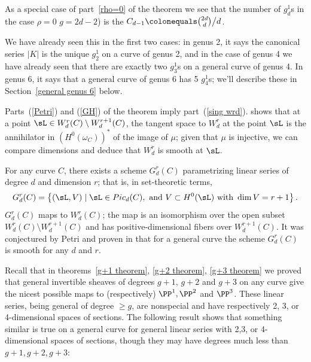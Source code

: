 \begin{remark}
 As a special case of part~\ref{rho=0} of the theorem we see that
 the number of $g^{1}_{d}$s
 in the case $\rho=0$
$g=2d-2$) is the 
%
 $C_{d-1}\colonequals  \tbinom{2d}{d}\big/ d$.

We have already seen this in the first two cases: in genus 2, it says
the canonical series $|K|$ is the unique $g^1_2$ on a curve of genus 2,
and in the case of genus 4 we have already seen  that there are exactly
two $g^1_3$s on a general curve of genus 4. In genus 6, it says that
a general curve of genus 6 has 5 $g^1_4$s; we'll describe these in
Section~\ref{general genus 6} below.
\end{remark}

\begin{remark}
Parts~(\ref{Petri}) and (\ref{GH}) of the theorem imply part~(\ref{sing wrd}). 
\cite{ACGH} shows that at a point $\sL  \in W^r_d(C)
\setminus W^{r+1}_d(C)$, the tangent space to $W^r_d$ at the point $\sL $
is the annihilator
in $(H^0(\omega_C))^*$ of the image of $\mu$; given that $\mu$ is
injective, we can compare dimensions and deduce that $W^r_d$ is smooth
at $\sL $.
\end{remark}

\begin{remark}
For any curve $C$, there exists a scheme $G^r_d(C)$ parametrizing
linear series of degree $d$ and dimension $r$; that is, in set-theoretic
terms,
$$
G^r_d(C) = \left\{ (\sL , V) \mid \sL  \in Pic_d(C), \text{ and }
V \subset H^0(\sL ) \text{ with } \dim V = r+1 \right\}.
$$
$G^r_d(C)$ maps to $W^r_d(C)$; the map is an isomorphism over the open
subset $W^r_d(C) \setminus W^{r+1}_d(C)$ and has positive-dimensional
fibers over $W^{r+1}_d(C)$. It was conjectured
by Petri and proven in \cite{Gieseker-Petri} that for a general curve
the scheme $G^r_d(C)$ is smooth for any $d$ and $r$.
\end{remark}


Recall that  in theorems~\ref{g+1 theorem}, \ref{g+2 theorem}, \ref{g+3
theorem} we proved that
general invertible sheaves of degrees $g+1$, $g+2$ and $g+3$ on any curve
give the nicest possible maps to (respectively) $\PP^1, \PP^2$ and
$\PP^3$. These
linear series, being general of degree $\geq g$, are  nonspecial and
have respectively
2, 3, or 4-dimensional spaces of sections. The following result shows
that something
similar is true on a general curve for general linear series with 2,3,
or 4-dimensional
spaces of sections, though they may have degrees much less than $g+1,
g+2, g+3$:

